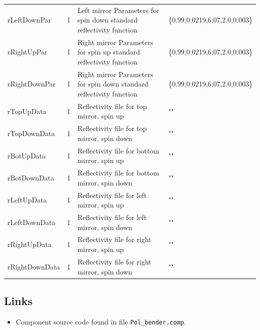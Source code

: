 \begin{longtable}{p{}p{}p{}p{}}
rLeftDownPar & 1 & Left mirror Parameters for spin down standard reflectivity function & \{0.99,0.0219,6.07,2.0,0.003\} \\
rRightUpPar & 1 & Right mirror Parameters for spin up standard reflectivity function & \{0.99,0.0219,6.07,2.0,0.003\} \\
rRightDownPar & 1 & Right mirror Parameters for spin down standard reflectivity function & \{0.99,0.0219,6.07,2.0,0.003\} \\
rTopUpData & 1 & Reflectivity file for top mirror, spin up & "" \\
rTopDownData & 1 & Reflectivity file for top mirror, spin down & "" \\
rBotUpData & 1 & Reflectivity file for bottom mirror, spin up & "" \\
rBotDownData & 1 & Reflectivity file for bottom mirror, spin down & "" \\
rLeftUpData & 1 & Reflectivity file for left mirror, spin up & "" \\
rLeftDownData & 1 & Reflectivity file for left mirror, spin down & "" \\
rRightUpData & 1 & Reflectivity file for right mirror, spin up & "" \\
rRightDownData & 1 & Reflectivity file for right mirror, spin down & "" \\
\bottomrule
\end{longtable}

\subsection*{Links}
\begin{itemize}
  \item Component source code found in file \texttt{Pol\_bender.comp}.
\end{itemize}
